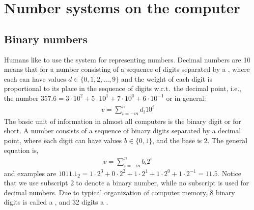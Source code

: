 \chapter{Number systems on the computer}
\label{app:numbers}
\section{Binary numbers}
\label{sec:binary}
Humans like to use the  system for representing numbers. Decimal numbers are  10 means that for a number consisting of a sequence of digits separated by a , where each  can have values $d \in \{0,1,2,\ldots,9\}$ and the weight of each digit is proportional to its place in the sequence of digits w.r.t.\ the decimal point, i.e., the number $357.6=3\cdot 10^2+5\cdot 10^1+7\cdot 10^0+6\cdot 10^{-1}$ or in general:
\begin{align}
  v = \sum_{i=-m}^nd_i10^i
\end{align}
The basic unit of information in almost all computers is the binary digit or  for short. A  number consists of a sequence of binary digits separated by a decimal point, where each digit can have values $b \in \{0,1\}$, and the base is $2$. The general equation is,
\begin{align}
  v = \sum_{i=-m}^nb_i2^i
\end{align}
and examples are $1011.1_2 = 1\cdot 2^3+0\cdot 2^2+1\cdot 2^1+1\cdot 2^0+1\cdot 2^{-1} = 11.5$. Notice that we use subscript 2 to denote a binary number, while no subscript is used for decimal numbers. Due to typical organization of computer memory, 8 binary digits is called a , and 32 digits a .

